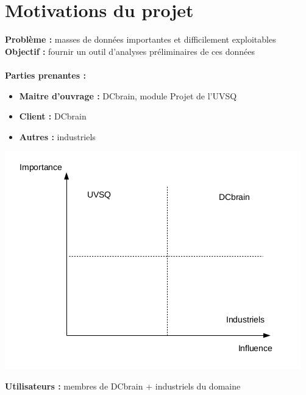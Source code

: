 	\section{Motivations du projet}
	\begin{frame}
		\textbf{Problème :} masses de données importantes et difficilement exploitables
		\textbf{Objectif :} fournir un outil d'analyses préliminaires de ces données
		\\~\\
		\pause
		\textbf{Parties prenantes :} \pause
		\begin{itemize}
			\item \textbf{Maitre d'ouvrage :} DCbrain, module Projet de l'UVSQ
			\item \textbf{Client :} DCbrain
			\item \textbf{Autres :} industriels
		\end{itemize}
		\begin{center}\includegraphics[scale=0.35]{../Cahier/diagPP.png}\end{center}
		\pause \vspace{-0.5em}
		\textbf{Utilisateurs :} membres de DCbrain + industriels du domaine
	\end{frame}	
	

